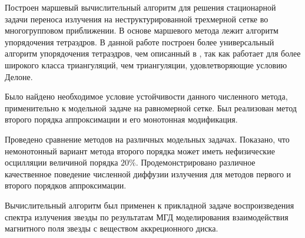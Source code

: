 \conclusion
Построен маршевый вычислительный алгоритм для решения стационарной задачи переноса излучения на неструктурированной трехмерной сетке во многогрупповом приближении. В основе маршевого метода лежит алгоритм упорядочения тетраэдров. В данной работе построен более универсальный алгоритм упорядочения тетраэдров, чем описанный в \cite{skalko_2014}, так как работает для более широкого класса триангуляций, чем триангуляции, удовлетворяющие условию Делоне.

Было найдено необходимое условие устойчивости данного численного метода, применительно к модельной задаче на равномерной сетке. Был реализован метод второго порядка аппроксимации и его монотонная модификация. 

Проведено сравнение методов на различных модельных задачах. Показано, что немонотонный вариант метода второго порядка может иметь нефизические осцилляции величиной порядка $20 \%$. Продемонстрировано различное качественное поведение численной диффузии излучения для методов первого и второго порядков аппроксимации.

Вычислительный алгоритм был применен к прикладной задаче воспроизведения спектра излучения звезды по результатам МГД моделирования взаимодействия магнитного поля звезды с веществом аккреционного диска. 